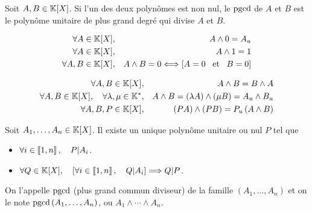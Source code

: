 \documentclass{magnolia}
\begin{document}
\begin{remarqueUnique}
\remarque Soit $A, B\in\polyK$. Si l'un des deux polynômes est non nul, le $\operatorname{pgcd}$ de $A$ et $B$ est le polynôme unitaire de plus grand degré qui divise $A$ et $B$.
\end{remarqueUnique}

\begin{proposition}
\begin{eqnarray*}
\forall A\in\polyK, & & A\wedge 0=A_u\\
\forall A\in\polyK, & & A\wedge 1=1\\
\forall A,B\in\polyK, & & A\wedge B=0 \ssi \cro{A=0 \et B=0}
\end{eqnarray*}
\end{proposition}

\begin{proposition}
\begin{eqnarray*}
\forall A,B\in\polyK, & & A\wedge B=B\wedge A\\
\forall A,B\in\polyK \qsep \forall\lambda,\mu\in\Ks,& &
  A\wedge B=\p{\lambda A}\wedge\p{\mu B}=A_u\wedge B_u\\
\forall A,B,P\in\polyK, & & \p{PA}\wedge\p{PB}=P_u\p{A\wedge B}\\
\end{eqnarray*}
\end{proposition}


\begin{definition}
Soit $A_1,\ldots,A_n\in\polyK$. Il existe un unique polynôme unitaire ou nul $P$ tel que
\begin{itemize}
\item $\forall i\in\left\llbracket 1,n\right\rrbracket,\quad P|A_i$.
\item $\forall Q\in\polyK \qsep \cro{\forall i\in\intere{1}{n}\qsep Q|A_i} \implique Q|P$.
\end{itemize}
On l'appelle $\operatorname{pgcd}$ (plus grand commun diviseur) de la famille $(A_1,\ldots,A_n)$ et on le note
$\operatorname{pgcd}\left(A_1,\ldots,A_n\right)$, ou $A_1\wedge\cdots\wedge A_n$.
\end{definition}
\end{document}
